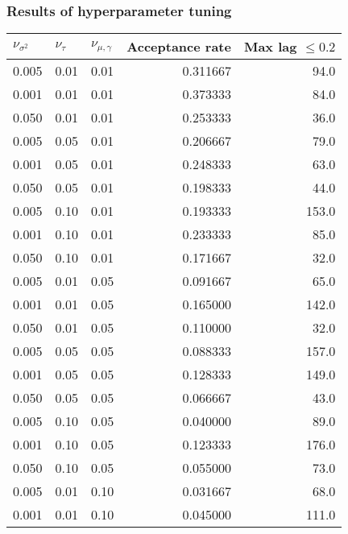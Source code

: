 \documentclass{article}
\begin{document}
\subsubsection{Results of hyperparameter tuning}
\begin{table}
  \begin{center}
\begin{tabular}{lllrr}
  $\nu_{\sigma^2}$ & $\nu_\tau$ & $\nu_{\mu, \gamma}$ & \textbf{Acceptance rate} & \textbf{Max lag $\leq 0.2$} \\
  \midrule
  0.005 &    0.01 &   0.01 &         0.311667 &           94.0 \\
  0.001 &    0.01 &   0.01 &         0.373333 &           84.0 \\
  0.050 &    0.01 &   0.01 &         0.253333 &           36.0 \\
  0.005 &    0.05 &   0.01 &         0.206667 &           79.0 \\
  0.001 &    0.05 &   0.01 &         0.248333 &           63.0 \\
  0.050 &    0.05 &   0.01 &         0.198333 &           44.0 \\
  0.005 &    0.10 &   0.01 &         0.193333 &          153.0 \\
  0.001 &    0.10 &   0.01 &         0.233333 &           85.0 \\
  0.050 &    0.10 &   0.01 &         0.171667 &           32.0 \\
  0.005 &    0.01 &   0.05 &         0.091667 &           65.0 \\
  0.001 &    0.01 &   0.05 &         0.165000 &          142.0 \\
  0.050 &    0.01 &   0.05 &         0.110000 &           32.0 \\
  0.005 &    0.05 &   0.05 &         0.088333 &          157.0 \\
  0.001 &    0.05 &   0.05 &         0.128333 &          149.0 \\
  0.050 &    0.05 &   0.05 &         0.066667 &           43.0 \\
  0.005 &    0.10 &   0.05 &         0.040000 &           89.0 \\
  0.001 &    0.10 &   0.05 &         0.123333 &          176.0 \\
  0.050 &    0.10 &   0.05 &         0.055000 &           73.0 \\
  0.005 &    0.01 &   0.10 &         0.031667 &           68.0 \\
  0.001 &    0.01 &   0.10 &         0.045000 &          111.0 \\

\end{tabular}
\end{center}
\end{table}
\end{document}
